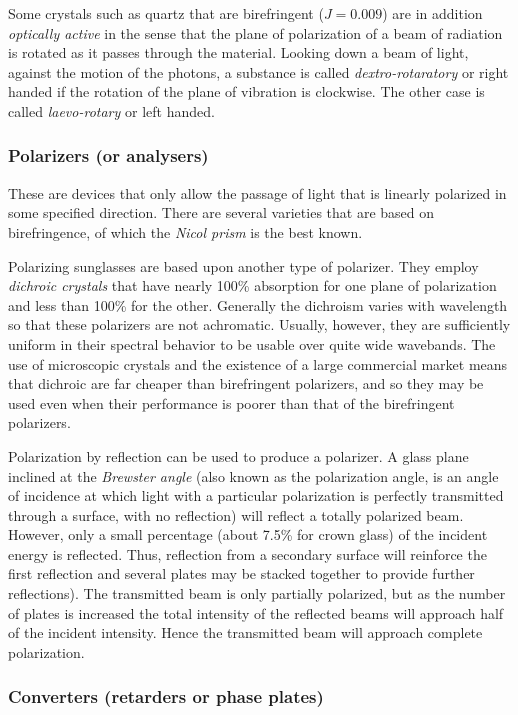 Some crystals such as quartz that are birefringent ($J=0.009$) are in addition {\it optically active} in the sense that the plane of polarization of a beam of radiation is
rotated as it passes through the material. Looking down a beam of light, against the motion of the photons, a substance is called {\it dextro-rotaratory} or right handed 
if the rotation of the plane of vibration is clockwise. The other case is called {\it
laevo-rotary} or left handed. 

\subsubsection{Polarizers (or analysers)}

These are devices that only allow the passage of light that is linearly polarized in some
specified direction. There are several varieties that are based on birefringence, of which
the {\it Nicol prism} is the best known.

Polarizing sunglasses are based upon another type of polarizer. They employ {\it dichroic crystals} that have nearly 100\% absorption for one plane of polarization and less than 100\% for the other. Generally the dichroism varies with wavelength so that these polarizers are not achromatic. Usually, however, they are sufficiently uniform in their spectral behavior to be usable over quite wide wavebands. The use of microscopic crystals and the existence of a large commercial market means that dichroic are far cheaper than birefringent polarizers, and so they may be used even when their performance is poorer than that of the birefringent polarizers.

Polarization by reflection can be used to produce a polarizer. A glass plane inclined at the {\it Brewster angle} (also known as the polarization angle, is an angle of incidence at which light with a particular polarization is perfectly transmitted through a surface, with no reflection) will reflect a totally polarized beam. However, only a small percentage (about 7.5\% for crown glass) of the incident energy is reflected. Thus, reflection from a secondary surface will reinforce the first reflection and several plates may be stacked together to provide further reflections). The transmitted beam is only partially polarized, but as the number of plates is increased the total intensity of the reflected beams will approach half of the incident intensity. Hence the transmitted beam will approach complete polarization. 

\subsubsection{Converters (retarders or phase plates)}

